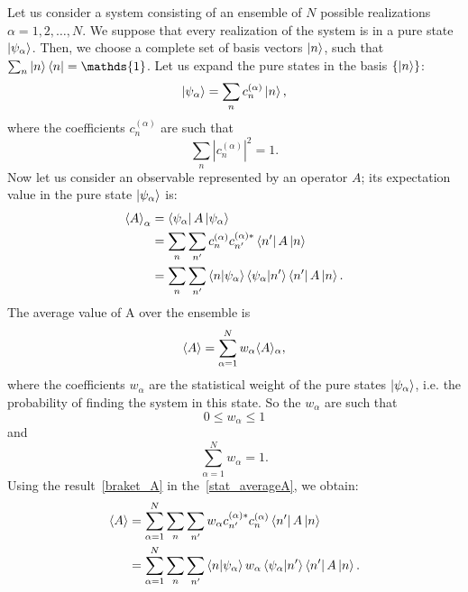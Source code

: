 Let us consider a system consisting of an ensemble of $N$ possible realizations $\alpha = 1, 2, \dots , N$. We suppose that every realization of the system is in a pure state $\ket{\psi_\alpha}$. Then, we choose a complete set of basis vectors $\ket{n}$, such that $\sum_n \ket{n}\bra{n} = \mathds{1}$. Let us expand the pure states in the basis $\{\ket{n}\}$:
\begin{equation*}
    \ket{\psi_\alpha} = \sum_n c_n^{(\alpha)}\ket{n},
\end{equation*}
where the coefficients $c_n^{(\alpha)}$ are such that
\begin{equation*}
    \sum_n |c_n^{(\alpha)}|^2 = 1.
\end{equation*}
Now let us consider an observable represented by an operator $A$; its expectation value in the pure state $\ket{\psi_\alpha}$ is:
\begin{align}
    \braket{A}_\alpha &= \bra{\psi_\alpha}A\ket{\psi_\alpha} \\
                      \label{braket_A}
                      &= \sum_n \sum_{n'} c_n^{(\alpha)}c_{n'}^{(\alpha)*} \bra{n'}A\ket{n} \\
                      &= \sum_n \sum_{n'} \braket{n|\psi_\alpha}\braket{\psi_\alpha|n'} \bra{n'}A\ket{n}.
\end{align}
The average value of A over the ensemble is
\begin{equation}
\label{stat_averageA}
    \braket{A} = \sum_{\alpha = 1}^N w_\alpha \langle A \rangle_\alpha,
\end{equation}
where the coefficients $w_\alpha$ are the statistical weight of the pure states $\ket{\psi_\alpha}$, i.e. the probability of finding the system in this state. 
So the $w_\alpha$ are such that
\begin{equation}
\label{charact_weights}
    0 \leq w_\alpha \leq 1
\end{equation}
and 
\begin{equation*}
    \sum_{\alpha=1}^N w_\alpha = 1.
\end{equation*}
Using the result~\ref{braket_A} in the~\ref{stat_averageA}, we obtain:
\begin{align}
    \braket{A} &= \sum_{\alpha = 1}^N \sum_n \sum_{n'} w_\alpha c_{n'}^{(\alpha)*} c_n^{(\alpha)} \bra{n'}A\ket{n} \\
                \label{total_stat_average}
               &= \sum_{\alpha = 1}^N \sum_n \sum_{n'} \braket{n|\psi_\alpha}w_\alpha \braket{\psi_\alpha|n'} \bra{n'}A\ket{n}.
\end{align}
